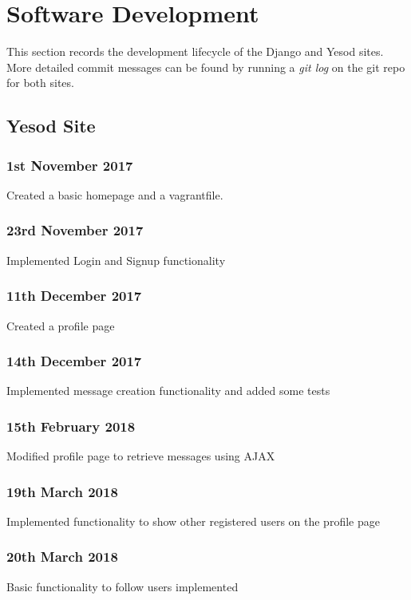 \section{Software Development}

This section records the development lifecycle of the Django and Yesod sites. More detailed commit messages
can be found by running a \textit{git log} on the git repo for both sites.

\subsection{Yesod Site}

\subsubsection{1st November 2017}
Created a basic homepage and a vagrantfile.

\subsubsection{23rd November 2017}
Implemented Login and Signup functionality

\subsubsection{11th December 2017}
Created a profile page

\subsubsection{14th December 2017}
Implemented message creation functionality and added some tests

\subsubsection{15th February 2018}
Modified profile page to retrieve messages using AJAX

\subsubsection{19th March 2018}
Implemented functionality to show other registered users on the profile page

\subsubsection{20th March 2018}
Basic functionality to follow users implemented

